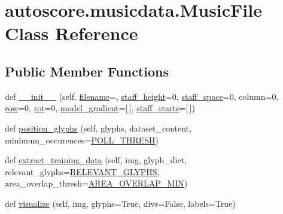 \hypertarget{classautoscore_1_1musicdata_1_1MusicFile}{}\section{autoscore.\+musicdata.\+Music\+File Class Reference}
\label{classautoscore_1_1musicdata_1_1MusicFile}
\subsection*{Public Member Functions}
\begin{DoxyCompactItemize}
\item 
def \hyperlink{classautoscore_1_1musicdata_1_1MusicFile_a25672185ef617b18270007e53e4e1681}{\+\_\+\+\_\+init\+\_\+\+\_\+} (self, \hyperlink{classautoscore_1_1musicdata_1_1MusicFile_afb514a66a95ae6d2b6064bffb4acfd40}{filename}=\textquotesingle{}\textquotesingle{}, \hyperlink{classautoscore_1_1musicdata_1_1MusicFile_a9730a491a3fbb499b523abab1a78eff2}{staff\+\_\+height}=0, \hyperlink{classautoscore_1_1musicdata_1_1MusicFile_ae6bac1c7525ccf4708542f1af914361f}{staff\+\_\+space}=0, column=0, \hyperlink{classautoscore_1_1musicdata_1_1MusicFile_a5a1d870c90397fcc18b659df3a24caba}{row}=0, \hyperlink{classautoscore_1_1musicdata_1_1MusicFile_aa6280fb328ef92537f3669b09eeaa454}{rot}=0, \hyperlink{classautoscore_1_1musicdata_1_1MusicFile_a1728265e16d8218aa9481a205d367572}{model\+\_\+gradient}=\mbox{[}$\,$\mbox{]}, \hyperlink{classautoscore_1_1musicdata_1_1MusicFile_a493bbcf3119052c610c6cf7bc4862865}{staff\+\_\+starts}=\mbox{[}$\,$\mbox{]})
\item 
def \hyperlink{classautoscore_1_1musicdata_1_1MusicFile_a099d02258a24d1e795ea87edee6342fc}{position\+\_\+glyphs} (self, glyphs, dataset\+\_\+content, minimum\+\_\+occurences=\hyperlink{namespaceautoscore_1_1musicdata_a4342208695b0441e76d13ad639c1d700}{P\+O\+L\+L\+\_\+\+T\+H\+R\+E\+SH})
\item 
def \hyperlink{classautoscore_1_1musicdata_1_1MusicFile_aa633c896f30aba125c4d15693d812f16}{extract\+\_\+training\+\_\+data} (self, img, glyph\+\_\+dict, relevant\+\_\+glyphs=\hyperlink{namespaceautoscore_1_1musicdata_a2d30a65a367d3fd398938b3d45c9dcab}{R\+E\+L\+E\+V\+A\+N\+T\+\_\+\+G\+L\+Y\+P\+HS}, area\+\_\+overlap\+\_\+thresh=\hyperlink{namespaceautoscore_1_1musicdata_aa2545f5fe006ee17a14f604063447c90}{A\+R\+E\+A\+\_\+\+O\+V\+E\+R\+L\+A\+P\+\_\+\+M\+IN})
\item 
def \hyperlink{classautoscore_1_1musicdata_1_1MusicFile_adf338d24330039e6dd3b15b7cec30b52}{visualize} (self, img, glyphs=True, divs=False, labels=True)
\end{DoxyCompactItemize}

